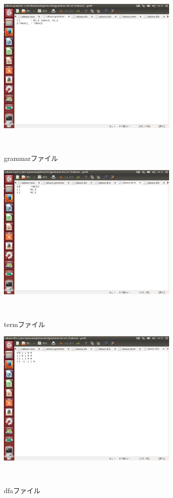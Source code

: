 \documentclass[11pt]{jsarticle}
\begin{document}
\begin{figure}[b]
 \begin{center}
  \includegraphics[width=90mm]{grammar.png}
 　\caption{grammarファイル}
 　\label{fig:kinshi}
 \end{center}
\end{figure}

\begin{figure}[b]
 \begin{center}
  \includegraphics[width=90mm]{term.png}
 　\caption{termファイル}
 　\label{fig:kinshi}
 \end{center}
\end{figure}

\begin{figure}[b]
 \begin{center}
  \includegraphics[width=90mm]{dfa.png}
 　\caption{dfaファイル}
 　\label{fig:kinshi}
 \end{center}
\end{figure}
\end{document}
